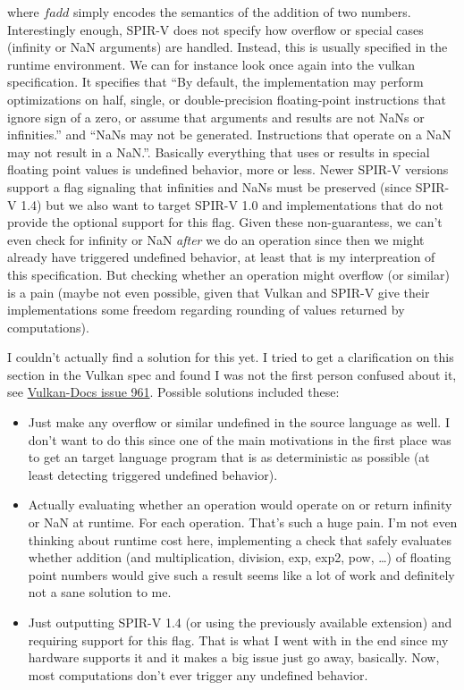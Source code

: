 \documentclass[letterpaper,12pt]{article}
\begin{document}
where $fadd$ simply encodes the semantics of the addition of two numbers.
Interestingly enough, SPIR-V does not specify how overflow or special
cases (infinity or NaN arguments) are handled. Instead, this is usually
specified in the runtime environment. We can for instance look once again into the vulkan
specification. It specifies that ``By default, the implementation may 
perform optimizations on half, single, or double-precision floating-point 
instructions that ignore sign of a zero, or assume that arguments 
and results are not NaNs or infinities.'' and ``NaNs may not be generated. 
Instructions that operate on a NaN may not result in a NaN.''.
Basically everything that uses or results in special floating point
values is undefined behavior, more or less. 
Newer SPIR-V versions support a flag signaling that infinities and NaNs 
must be preserved (since SPIR-V 1.4) but we also want to target SPIR-V 1.0
and implementations that do not provide the optional support for
this flag.
Given these non-guarantess, we can't even check for infinity or NaN
\textit{after} we do an operation since then we might already have
triggered undefined behavior, at least that is my interpreation of
this specification. But checking whether an operation might overflow
(or similar) is a pain (maybe not even possible, given that Vulkan and
SPIR-V give their implementations some freedom regarding
rounding of values returned by computations).

I couldn't actually find a solution for this yet. I tried to get
a clarification on this section in the Vulkan spec and found I was not
the first person confused about it, see \href{https://github.com/KhronosGroup/Vulkan-Docs/issues/961}{Vulkan-Docs issue 961}.
Possible solutions included these:

\begin{itemize}
	\item Just make any overflow or similar undefined in the source language
		as well. I don't want to do this since one of the main motivations
		in the first place was to get an target language program
		that is as deterministic as possible (at least detecting triggered
		undefined behavior).
	\item Actually evaluating whether an operation would operate on or
		return infinity or NaN at runtime. For each operation. That's
		such a huge pain. I'm not even thinking about runtime cost here,
		implementing a check that safely evaluates whether addition
		(and multiplication, division, exp, exp2, pow, \ldots) of floating
		point numbers would give such a result seems like a lot of work
		and definitely not a sane solution to me.
	\item Just outputting SPIR-V 1.4 (or using the previously available
		extension) and requiring support for this flag. That is what
		I went with in the end since my hardware supports it and it
		makes a big issue just go away, basically. Now, most computations
		don't ever trigger any undefined behavior.
\end{itemize}
\end{document}
